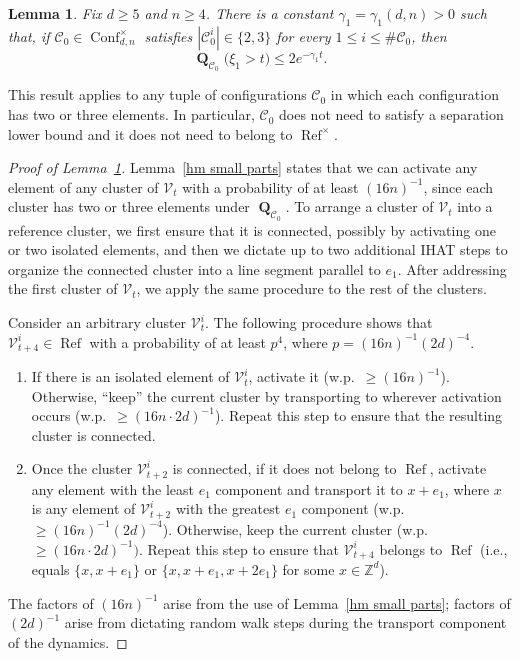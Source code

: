 \documentclass[11pt,reqno]{amsart}
\newtheorem{lemma}{Lemma}[section]
\theoremstyle{definition}
\numberwithin{equation}{section}
\newcommand{\Z}{\mathbb{Z}}
\newcommand{\1}{\mathbf{1}}
\DeclareMathOperator{\QQ}{\mathbf{Q}}
\DeclareMathOperator{\Refcon}{\mathrm{Ref}}
\newcommand{\CC}{\mathcal{C}}
\newcommand{\VV}{\mathcal{V}}
\DeclareMathOperator{\Conf}{\mathrm{Conf}}
\begin{document}
\begin{lemma}\label{xi tail}
Fix $d \geq 5$ and $n \geq 4$. There is a constant $\gamma_1 = \gamma_1 (d,n) > 0$ such that, if $\CC_0 \in \Conf_{d,n}^\times$ satisfies $|\CC_0^i| \in \{2,3\}$ for every $1 \leq i \leq \#\CC_0$, then 
\begin{equation}\label{eq xi tail}
\QQ_{\CC_0} \big( \xi_1 > t \big) \leq 2e^{-\gamma_1 t}.
\end{equation}
\end{lemma}

This result applies to any tuple of configurations $\CC_0$ in which each configuration has two or three elements. In particular, $\CC_0$ does not need to satisfy a separation lower bound and it does not need to belong to $\Refcon^\times$.

\begin{proof}[Proof of Lemma~\ref{xi tail}]
Lemma~\ref{hm small parts} states that we can activate any element of any cluster of $\VV_t$ with a probability of at least $(16n)^{-1}$, since each cluster has two or three elements under $\QQ_{\CC_0}$. To arrange a cluster of $\VV_t$ into a reference cluster, we first ensure that it is connected, possibly by activating one or two isolated elements, and then we dictate up to two additional IHAT steps to organize the connected cluster into a line segment parallel to $e_1$. After addressing the first cluster of $\VV_t$, we apply the same procedure to the rest of the clusters.

Consider an arbitrary cluster $\VV_t^i$. The following procedure shows that $\VV_{t+4}^i \in \Refcon$ with a probability of at least $p^4$, where $p = (16n)^{-1} (2d)^{-4}$.
\begin{enumerate}
\item If there is an isolated element of $\VV_t^i$, activate it (w.p.\ $\geq (16n)^{-1}$). Otherwise, ``keep'' the current cluster by transporting to wherever activation occurs (w.p.\ $\geq (16n\cdot 2d)^{-1}$). Repeat this step to ensure that the resulting cluster is connected.
\item Once the cluster $\VV_{t+2}^i$ is connected, if it does not belong to $\Refcon$, activate any element with the least $e_1$ component and transport it to $x+e_1$, where $x$ is any element of $\VV_{t+2}^i$ with the greatest $e_1$ component (w.p.\ $\geq (16n)^{-1} (2d)^{-4}$). Otherwise, keep the current cluster (w.p.\ $\geq (16n \cdot 2d)^{-1})$. Repeat this step to ensure that $\VV_{t+4}^i$ belongs to $\Refcon$ (i.e., equals $\{x,x+e_1\}$ or $\{x,x+e_1,x+2e_1\}$ for some $x \in \Z^d$).
\end{enumerate}
The factors of $(16n)^{-1}$ arise from the use of Lemma~\ref{hm small parts}; factors of $(2d)^{-1}$ arise from dictating random walk steps during the transport component of the dynamics.


\end{proof}
\end{document}
